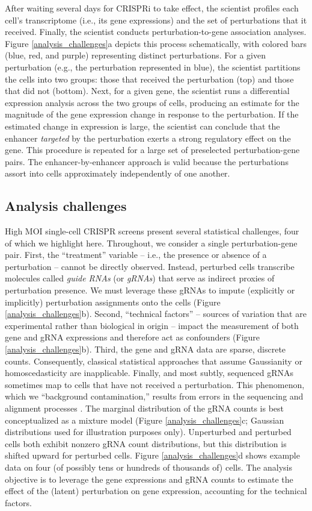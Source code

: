 \documentclass[12pt]{article}
\begin{document}
After waiting several days for CRISPRi to take effect, the scientist profiles each cell's transcriptome (i.e., its gene expressions) and the set of perturbations that it received. Finally, the scientist conducts perturbation-to-gene association analyses. Figure \ref{analysis_challenges}a depicts this process schematically, with colored bars (blue, red, and purple) representing distinct perturbations. For a given perturbation (e.g., the perturbation represented in blue), the scientist partitions the cells into two groups: those that received the perturbation (top) and those that did not (bottom). Next, for a given gene, the scientist runs a differential expression analysis across the two groups of cells, producing an estimate for the magnitude of the gene expression change in response to the perturbation. If the estimated change in expression is large, the scientist can conclude that the enhancer \textit{targeted} by the perturbation exerts a strong regulatory effect on the gene. This procedure is repeated for a large set of preselected perturbation-gene pairs. The enhancer-by-enhancer approach is valid because the perturbations assort into cells approximately independently of one another.

\subsection{Analysis challenges}
High MOI single-cell CRISPR screens present several statistical challenges, four of which we highlight here. Throughout, we consider a single perturbation-gene pair. First, the ``treatment'' variable -- i.e., the presence or absence of a perturbation -- cannot be directly observed. Instead, perturbed cells transcribe molecules called  \textit{guide RNAs} (or \textit{gRNAs}) that serve as indirect proxies of perturbation presence. We must leverage these gRNAs to impute (explicitly or implicitly) perturbation assignments onto the cells (Figure \ref{analysis_challenges}b). Second, ``technical factors'' -- sources of variation that are experimental rather than biological in origin -- impact the measurement of both gene and gRNA expressions and therefore act as confounders (Figure \ref{analysis_challenges}b). Third, the gene and gRNA data are sparse, discrete counts. Consequently, classical statistical approaches that assume Gaussianity or homoscedasticity are inapplicable. Finally, and most subtly, sequenced gRNAs sometimes map to cells that have not received a perturbation. This phenomenon, which we ``background contamination,'' results from errors in the sequencing and alignment processes \cite{Replogle2020}. The marginal distribution of the gRNA counts is best conceptualized as a mixture model (Figure \ref{analysis_challenges}c; Gaussian distributions used for illustration purposes only). Unperturbed and perturbed cells both exhibit nonzero gRNA count distributions, but this distribution is shifted upward for perturbed cells. Figure \ref{analysis_challenges}d shows example data on four (of possibly tens or hundreds of thousands of) cells. The analysis objective is to leverage the gene expressions and gRNA counts to estimate the effect of the (latent) perturbation on gene expression, accounting for the technical factors.
\end{document}
